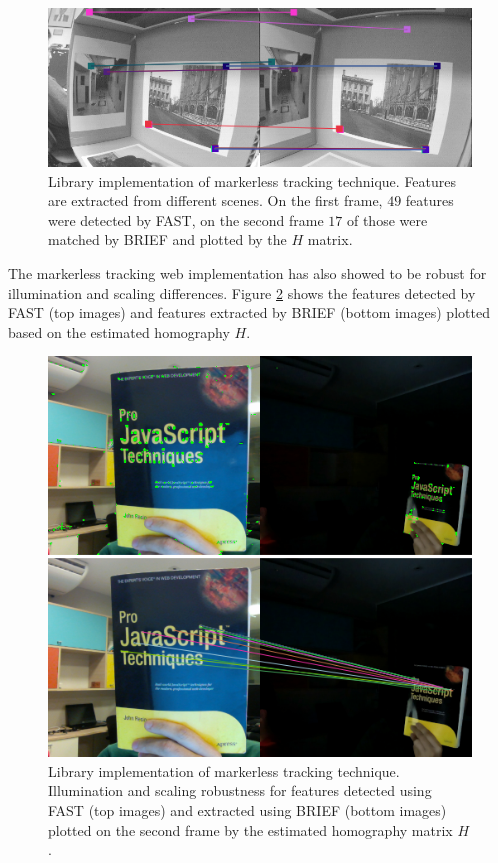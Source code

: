 \begin{figure}[!htb]
  \centering
  \includegraphics[width=\linewidth]{chapters/evaluation/keypoints_building.png}
  \caption{Library implementation of markerless tracking technique. Features are extracted from different scenes. On the first frame, $49$ features were detected by FAST, on the second frame $17$ of those were matched by BRIEF and plotted by the $H$ matrix.}
  \label{figure:keypoints_building}
\end{figure}

The markerless tracking web implementation has also showed to be robust for illumination and scaling differences. Figure \ref{figure:keypoints_fast_brief} shows the features detected by FAST (top images) and features extracted by BRIEF (bottom images) plotted based on the estimated homography $H$.

\begin{figure}[!htb]
  \centering
  \includegraphics[width=\linewidth]{chapters/evaluation/keypoints_fast_brief.png}
  \caption{Library implementation of markerless tracking technique. Illumination and scaling robustness for features detected using FAST (top images) and extracted using BRIEF (bottom images) plotted on the second frame by the estimated homography matrix $H$.}
  \label{figure:keypoints_fast_brief}
\end{figure}

